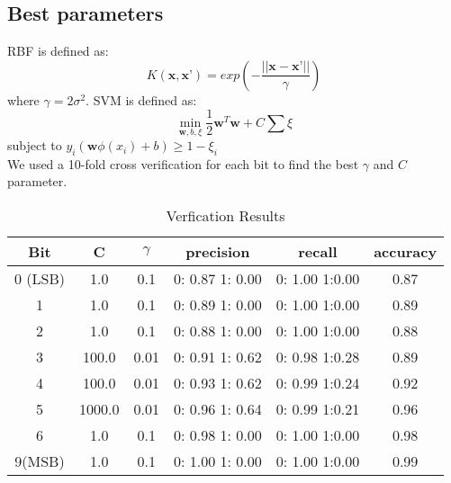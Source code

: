 \documentclass[pdftex,a4paper,12pt]{article}
\begin{document}
 \subsection{Best parameters}
 RBF is defined as: 
$$K(\textbf{x},\textbf{x'}) = exp(-\frac{||\textbf{x} - \textbf{x'} ||}{\gamma} )$$ where $\gamma = 2\sigma^2$\cite{vert2004primer}.  SVM is defined as:
\begin{equation}
\mathop{min}_{\textbf{w}, b, \textbf{$\xi$} } \frac{1}{2} \textbf{w}^T\textbf{w} + C\sum {\xi}
\end{equation}
subject to $y_i(\textbf{w}\phi(x_i) + b) \geq 1 - \xi_i$ \cite{LIBSVM}\\
We used a 10-fold cross verification for each bit to find the best $\gamma$ and $C$ parameter.

\begin{table}[h]
{\centering
\begin{tabular}{|c|c|c|c|c|c|} \hline
	Bit 		&			C			&			$\gamma$		&		precision			&		recall				&		accuracy			\\	\hline
0 (LSB)		&			1.0		&			0.1					&	0: 0.87	1: 0.00	&	0: 1.00	1:0.00	&			0.87				\\	\hline
1 				&			1.0		&			0.1					&	0: 0.89	1: 0.00	&	0: 1.00	1:0.00	&			0.89				\\	\hline
2 				&			1.0		&			0.1					&	0: 0.88	1: 0.00	&	0: 1.00	1:0.00	&			0.88				\\	\hline
3 				&			100.0		&		0.01				&	0: 0.91	1: 0.62	&	0: 0.98	1:0.28	&			0.89				\\	\hline
4 				&			100.0		&		0.01				&	0: 0.93	1: 0.62	&	0: 0.99	1:0.24	&			0.92				\\	\hline
5 				&			1000.0	&		0.01				&	0: 0.96	1: 0.64	&	0: 0.99	1:0.21	&			0.96				\\	\hline
6 				&			1.0		&			0.1					&	0: 0.98	1: 0.00	&	0: 1.00	1:0.00	&			0.98				\\	\hline
9(MSB) 		&			1.0		&			0.1					&	0: 1.00	1: 0.00	&	0: 1.00	1:0.00	&			0.99				\\	\hline
\end{tabular}
\caption{Verfication Results}          
\label{table:verfresults}}
\end{table}




\end{document}
